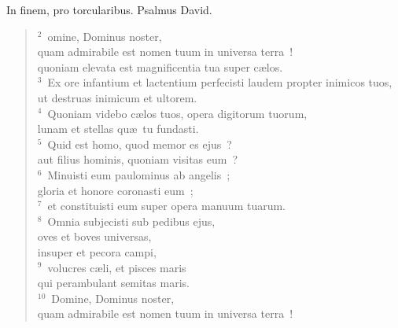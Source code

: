 \bchapter[Psalm]
In finem, pro torcularibus. Psalmus David.
\begin{verse}${}^{2}$~omine, Dominus noster,\\ quam admirabile est nomen tuum in universa terra~!\\ quoniam elevata est magnificentia tua super c\ae los.\\
${}^{3}$~Ex ore infantium et lactentium perfecisti laudem propter inimicos tuos,\\ ut destruas inimicum et ultorem.\\
${}^{4}$~Quoniam videbo c\ae los tuos, opera digitorum tuorum,\\ lunam et stellas qu\ae\ tu fundasti.\\
${}^{5}$~Quid est homo, quod memor es ejus~?\\ aut filius hominis, quoniam visitas eum~?\\
${}^{6}$~Minuisti eum paulominus ab angelis~;\\ gloria et honore coronasti eum~;\\
${}^{7}$~et constituisti eum super opera manuum tuarum.\\
${}^{8}$~Omnia subjecisti sub pedibus ejus,\\ oves et boves universas,\\ insuper et pecora campi,\\
${}^{9}$~volucres c\ae li, et pisces maris\\ qui perambulant semitas maris.\\
${}^{10}$~Domine, Dominus noster,\\ quam admirabile est nomen tuum in universa terra~!\end{verse}



